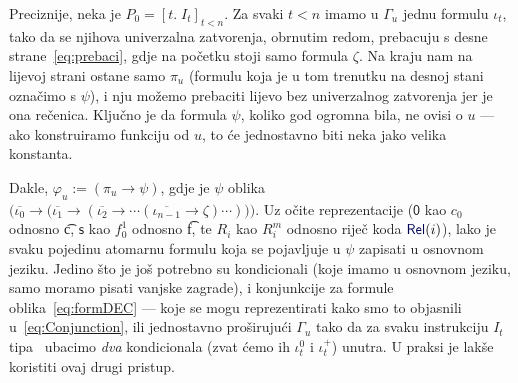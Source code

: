 Preciznije, neka je $P_0=[t.\;I_t]_{t<n}$. Za svaki $t<n$ imamo u $\Gamma_u$ jednu formulu $\iota_t$, tako da se njihova univerzalna zatvorenja, obrnutim redom, prebacuju s desne strane~\eqref{eq:prebaci}, gdje na početku stoji samo formula $\zeta$. Na kraju nam na lijevoj strani ostane samo $\pi_u$ (formulu koja je u tom trenutku na desnoj stani označimo s $\psi$), i nju možemo prebaciti lijevo bez univerzalnog zatvorenja jer je ona rečenica. Ključno je da formula $\psi$, koliko god ogromna bila, ne ovisi o $u$ --- ako konstruiramo funkciju od $u$, to će jednostavno biti neka jako velika konstanta.

    Dakle, $\varphi_u:=(\pi_u\to\psi)$, gdje je $\psi$ oblika $\bigl(\overline{\iota_0}\to\bigl(\overline{\iota_1}\to(\overline{\iota_2}\to\dotsb(\overline{\iota_{n-1}}\to\zeta)\dotsm)\bigr)\bigr)$\text.
Uz očite reprezentacije ($\mathsf0$ kao $c_0$ odnosno \t c, $\mathsf s$ kao $f_0^1$ odnosno \t f, te $R_i$ kao $R_i^m$ odnosno riječ koda $\f{Rel}(i)$), lako je svaku pojedinu atomarnu formulu koja se pojavljuje u $\psi$ zapisati u osnovnom jeziku. Jedino što je još potrebno su kondicionali (koje imamo u osnovnom jeziku, samo moramo pisati vanjske zagrade), i konjunkcije za formule oblika~\eqref{eq:formDEC} --- koje se mogu reprezentirati kako smo to objasnili u~\eqref{eq:Conjunction}, ili jednostavno proširujući $\Gamma_u$ tako da za svaku instrukciju $I_t$ tipa \dec\ ubacimo \emph{dva} kondicionala (zvat ćemo ih $\iota_t^0$ i $\iota_t^+$) unutra. U praksi je lakše koristiti ovaj drugi pristup.

